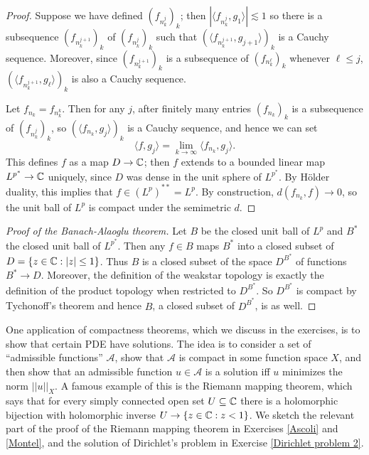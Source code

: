 \begin{proof}
Suppose we have defined $(f_{n_{k}^j})_{k}$; then $|\langle f_{n_{k}^j}, g_1\rangle| \lesssim 1$ so there is a subsequence $(f_{n_{k}^{j+1}})_{k}$ of $(f_{n_{k}^j})_{k}$ such that $(\langle f_{n_{k}^{j+1}}, g_{j+1}\rangle)_{k}$ is a Cauchy sequence.
Moreover, since $(f_{n_{k}^{j+1}})_{k}$ is a subsequence of $(f_{n_{k}^\ell})_{k}$ whenever $\ell \leq j$, $(\langle f_{n_{k}^{j+1}}, g_\ell\rangle)_{k}$ is also a Cauchy sequence.

Let $f_{n_{k}} = f_{n_{k}^k}$. Then for any $j$, after finitely many entries $(f_{n_{k}})_{k}$ is a subsequence of $(f_{n_{k}^j})_{k}$, so $(\langle f_{n_{k}}, g_{j}\rangle)_{k}$ is a Cauchy sequence, and hence we can set
\[\langle f, g_{j}\rangle = \lim_{k \to \infty} \langle f_{n_{k}}, g_{j}\rangle.\]
This defines $f$ as a map $D \to \mathbb{C}$; then $f$ extends to a bounded linear map $L^{p^*} \to \mathbb{C}$ uniquely, since $D$ was dense in the unit sphere of $L^{p^*}$.
By H\"older duality, this implies that $f \in (L^p)^{**} = L^p$.
By construction, $d(f_{n_{k}}, f) \to 0$, so the unit ball of $L^p$ is compact under the semimetric $d$.
\end{proof}

\begin{proof}[Proof of the Banach-Alaoglu theorem]
Let $B$ be the closed unit ball of $L^p$ and $B^*$ the closed unit ball of $L^{p^*}$.
Then any $f \in B$ maps $B^*$ into a closed subset of $D = \{z \in \mathbb{C}: |z| \leq 1\}$.
Thus $B$ is a closed subset of the space $D^{B^*}$ of functions $B^* \to D$.
Moreover, the definition of the weakstar topology is exactly the definition of the product topology when restricted to $D^{B^*}$.
So $D^{B^*}$ is compact by Tychonoff's theorem and hence $B$, a closed subset of $D^{B^*}$, is as well.
\end{proof}

One application of compactness theorems, which we discuss in the exercises, is to show that certain PDE have solutions.
The idea is to consider a set of ``admissible functions'' $\mathcal A$, show that $\mathcal A$ is compact in some function space $X$, and then show that an admissible function $u \in \mathcal A$ is a solution iff $u$ minimizes the norm $||u||_X$.
A famous example of this is the Riemann mapping theorem, which says that for every simply connected open set $U \subseteq \mathbb{C}$ there is a holomorphic bijection with holomorphic inverse $U \to \{z \in \mathbb{C}: z < 1\}$.
We sketch the relevant part of the proof of the Riemann mapping theorem in Exercises \ref{Ascoli} and \ref{Montel}, and the solution of Dirichlet's problem in Exercise \ref{Dirichlet problem 2}.

